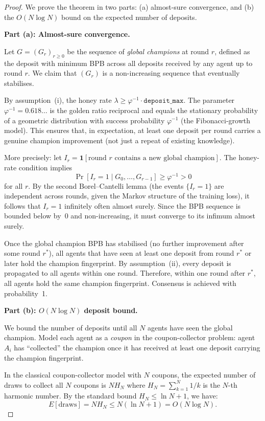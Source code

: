 \begin{proof}
We prove the theorem in two parts: (a) almost-sure convergence, and
(b) the $O(N \log N)$ bound on the expected number of deposits.

\medskip
\textbf{Part (a): Almost-sure convergence.}

Let $G = (G_r)_{r \geq 0}$ be the sequence of \emph{global champions}
at round $r$, defined as the deposit with minimum BPB across all
deposits received by any agent up to round $r$.  We claim that
$(G_r)$ is a non-increasing sequence that eventually stabilises.

By assumption~(i), the honey rate $\lambda \geq \varphi^{-1} \cdot
\texttt{deposit\_max}$.  The parameter $\varphi^{-1} = 0.618\ldots$ is
the golden ratio reciprocal and equals the stationary probability of a
geometric distribution with success probability $\varphi^{-1}$
(the Fibonacci-growth model).  This ensures that, in expectation, at
least one deposit per round carries a genuine champion improvement (not
just a repeat of existing knowledge).

More precisely: let $I_r = \mathbf{1}[\text{round } r \text{ contains a
new global champion}]$.  The honey-rate condition implies
\[
  \Pr[I_r = 1 \mid G_0, \ldots, G_{r-1}] \geq \varphi^{-1} > 0
\]
for all $r$.  By the second Borel--Cantelli lemma (the events $\{I_r = 1\}$
are independent across rounds, given the Markov structure of the
training loss), it follows that $I_r = 1$ infinitely often almost
surely.  Since the BPB sequence is bounded below by~0 and
non-increasing, it must converge to its infimum almost surely.

Once the global champion BPB has stabilised (no further improvement
after some round $r^*$), all agents that have seen at least one deposit
from round $r^*$ or later hold the champion fingerprint.  By
assumption~(ii), every deposit is propagated to all agents within one
round.  Therefore, within one round after $r^*$, all agents hold
the same champion fingerprint.  Consensus is achieved with probability~1.

\medskip
\textbf{Part (b): $O(N \log N)$ deposit bound.}

We bound the number of deposits until all $N$ agents have seen the
global champion.  Model each agent as a \emph{coupon} in the
coupon-collector problem: agent $A_i$ has ``collected'' the champion
once it has received at least one deposit carrying the champion
fingerprint.

In the classical coupon-collector model with $N$ coupons, the expected
number of draws to collect all $N$ coupons is $N H_N$ where $H_N =
\sum_{k=1}^{N} 1/k$ is the $N$-th harmonic number.  By the standard
bound $H_N \leq \ln N + 1$, we have:
\[
  E[\text{draws}] = N H_N \leq N(\ln N + 1) = O(N \log N).
\]


\end{proof}
